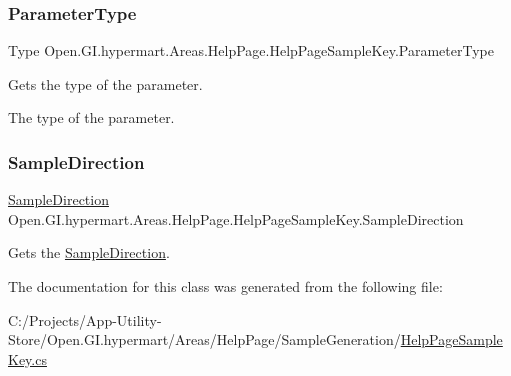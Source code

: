 \hypertarget{class_open_1_1_g_i_1_1hypermart_1_1_areas_1_1_help_page_1_1_help_page_sample_key_afa5b00d332331b114e9391367bda2bf0}{}\label{class_open_1_1_g_i_1_1hypermart_1_1_areas_1_1_help_page_1_1_help_page_sample_key_afa5b00d332331b114e9391367bda2bf0} 
\subsubsection{\texorpdfstring{Parameter\+Type}{ParameterType}}
{\footnotesize\ttfamily Type Open.\+G\+I.\+hypermart.\+Areas.\+Help\+Page.\+Help\+Page\+Sample\+Key.\+Parameter\+Type\hspace{0.3cm}{\ttfamily [get]}}



Gets the type of the parameter. 

The type of the parameter. \hypertarget{class_open_1_1_g_i_1_1hypermart_1_1_areas_1_1_help_page_1_1_help_page_sample_key_a62a3b3c50ce55cf2b20b4f859776f884}{}\label{class_open_1_1_g_i_1_1hypermart_1_1_areas_1_1_help_page_1_1_help_page_sample_key_a62a3b3c50ce55cf2b20b4f859776f884} 
\subsubsection{\texorpdfstring{Sample\+Direction}{SampleDirection}}
{\footnotesize\ttfamily \hyperlink{namespace_open_1_1_g_i_1_1hypermart_1_1_areas_1_1_help_page_a96790152101b7f9c7e4ff518bb45c822}{Sample\+Direction} Open.\+G\+I.\+hypermart.\+Areas.\+Help\+Page.\+Help\+Page\+Sample\+Key.\+Sample\+Direction\hspace{0.3cm}{\ttfamily [get]}}



Gets the \hyperlink{class_open_1_1_g_i_1_1hypermart_1_1_areas_1_1_help_page_1_1_help_page_sample_key_a62a3b3c50ce55cf2b20b4f859776f884}{Sample\+Direction}. 



The documentation for this class was generated from the following file\+:\begin{DoxyCompactItemize}
\item 
C\+:/\+Projects/\+App-\/\+Utility-\/\+Store/\+Open.\+G\+I.\+hypermart/\+Areas/\+Help\+Page/\+Sample\+Generation/\hyperlink{_help_page_sample_key_8cs}{Help\+Page\+Sample\+Key.\+cs}\end{DoxyCompactItemize}
